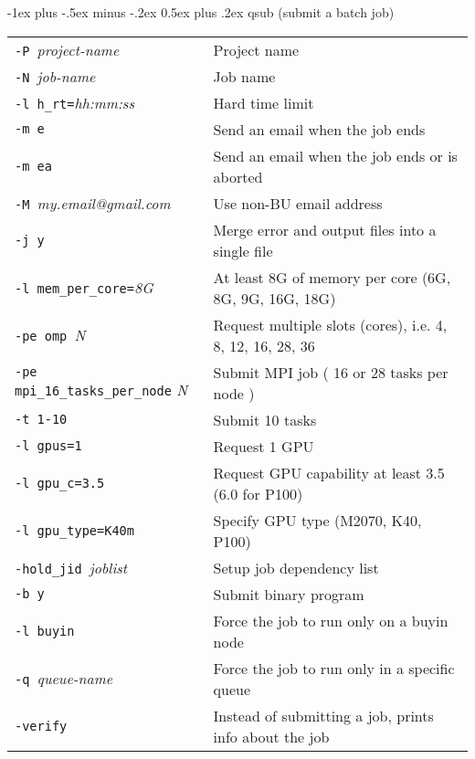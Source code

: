 \documentclass[10pt,landscape]{article}
\makeatletter
\renewcommand{\section}{\@startsection{section}{1}{0mm}%
                                {-1ex plus -.5ex minus -.2ex}%
                                {0.5ex plus .2ex}%
                                {\normalfont\large\bfseries}}
\makeatother
\begin{document}
\begin{multicols*}{2}
\section{qsub (submit a batch job) }
\begin{tabular}{@{}ll@{}}
\verb!-P !\textit{project-name}   & Project name \\
\verb!-N !\textit{job-name}   & Job name\\
\verb!-l h_rt=!\textit{hh:mm:ss}   & Hard time limit\\
\verb!-m e!  & Send an email when the job ends\\
\verb!-m ea!  & Send an email when the job ends or is aborted\\
\verb!-M !\textit{my.email@gmail.com}  & Use non-BU email address\\
\verb!-j y ! & Merge error and output files into a single file\\
\verb!-l mem_per_core=!\textit{8G}  & At least 8G of memory per core (6G, 8G, 9G, 16G, 18G)\\
\verb!-pe omp !\textit{N}  & Request multiple slots (cores), i.e. 4, 8, 12, 16, 28, 36 \\
\verb!-pe mpi_16_tasks_per_node! \textit{N}  & Submit MPI job ( 16 or 28 tasks per node ) \\
\verb!-t 1-10 !  & Submit 10 tasks \\
\verb!-l gpus=1 !  & Request 1 GPU \\
\verb!-l gpu_c=3.5 !  & Request GPU capability at least 3.5 (6.0 for P100) \\
\verb!-l gpu_type=K40m !  & Specify GPU type (M2070, K40, P100) \\
\verb!-hold_jid !\textit{joblist}  & Setup job dependency list \\
\verb!-b y !  & Submit binary program \\
\verb!-l buyin !  & Force the job to run only on a buyin node \\
\verb!-q !\textit{queue-name}   & Force the job to run only in a specific queue \\
\verb!-verify ! & Instead of submitting a job, prints info about the job
\end{tabular}
\vspace{10pt}


\end{multicols*}
\end{document}
